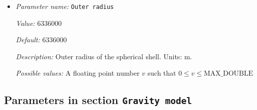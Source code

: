 \begin{itemize}
{\it Value:} 360


{\it Default:} 360


{\it Description:} Opening angle in degrees of the section of the shell that we want to build. The only opening angles that are allowed for this geometry are 90, 180, and 360 in 2d; and 90 and 360 in 3d. Units: degrees.


{\it Possible values:} A floating point number $v$ such that $0 \leq v \leq 360$
\item {\it Parameter name:} {\tt Outer radius}
\label{parameters:Geometry model/Spherical shell/Outer radius}


{\it Value:} 6336000


{\it Default:} 6336000


{\it Description:} Outer radius of the spherical shell. Units: m.


{\it Possible values:} A floating point number $v$ such that $0 \leq v \leq \text{MAX\_DOUBLE}$
\end{itemize}

\subsection{Parameters in section \tt Gravity model}
\label{parameters:Gravity_20model}

